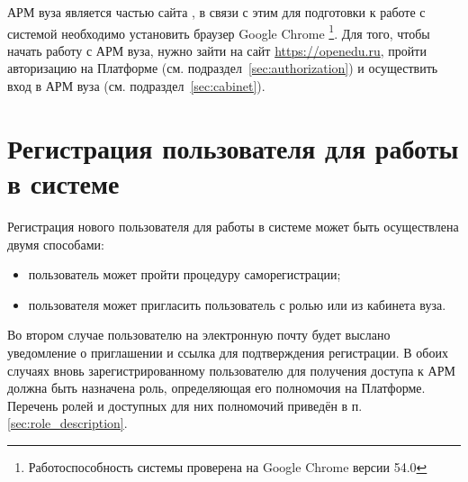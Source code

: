 АРМ вуза является частью сайта , 
в связи с этим для подготовки к работе с системой необходимо установить браузер Google Chrome%
\footnote{Работоспособность системы проверена на Google Chrome версии 54.0}.
Для того, чтобы начать работу с АРМ вуза, нужно зайти на сайт  \url{https://openedu.ru},
пройти авторизацию на Платформе (см. подраздел~\ref{sec:authorization}) и осуществить вход в АРМ вуза 
(см. подраздел~\ref{sec:cabinet}). 

\section{Регистрация пользователя для работы в системе}
	Регистрация нового пользователя для работы в системе может быть осуществлена двумя способами:
	\begin{itemize}
		\item пользователь может пройти процедуру саморегистрации;
		\item пользователя может пригласить пользователь с ролью  или  из кабинета вуза.
	\end{itemize}
	Во втором случае пользователю на электронную почту будет выслано уведомление о приглашении и ссылка для подтверждения регистрации. В обоих случаях вновь зарегистрированному пользователю для получения доступа к АРМ должна быть назначена роль, определяющая его полномочия на Платформе. Перечень ролей и доступных для них полномочий приведён в п.\ref{sec:role_description}.
